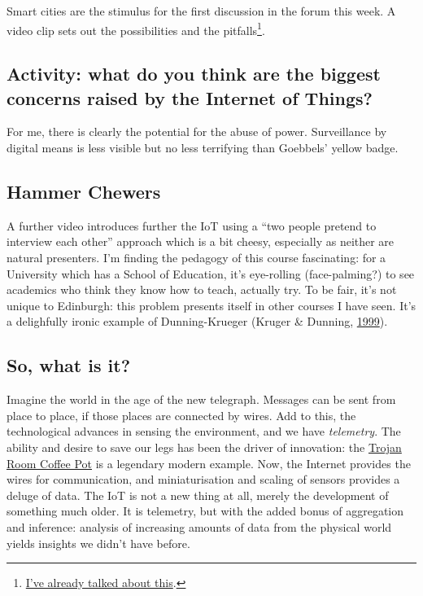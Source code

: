 \documentclass[
]{book}
\begin{document}
Smart cities are the stimulus for the first discussion in the forum this week. A video clip sets out the possibilities and the pitfalls\footnote{\protect\hyperlink{china-scs}{I've already talked about this}.}.

\hypertarget{activity-what-do-you-think-are-the-biggest-concerns-raised-by-the-internet-of-things}{%
\subsection{Activity: what do you think are the biggest concerns raised by the Internet of Things?}\label{activity-what-do-you-think-are-the-biggest-concerns-raised-by-the-internet-of-things}}

For me, there is clearly the potential for the abuse of power. Surveillance by digital means is less visible but no less terrifying than Goebbels' yellow badge.

\hypertarget{hammer-chewers}{%
\subsection{Hammer Chewers}\label{hammer-chewers}}

A further video introduces further the IoT using a ``two people pretend to interview each other'' approach which is a bit cheesy, especially as neither are natural presenters. I'm finding the pedagogy of this course fascinating: for a University which has a School of Education, it's eye-rolling (face-palming?) to see academics who think they know how to teach, actually try. To be fair, it's not unique to Edinburgh: this problem presents itself in other courses I have seen. It's a delighfully ironic example of Dunning-Krueger (Kruger \& Dunning, \protect\hyperlink{ref-Kruger1999}{1999}).

\hypertarget{so-what-is-it}{%
\subsection{So, what is it?}\label{so-what-is-it}}

Imagine the world in the age of the new telegraph. Messages can be sent from place to place, if those places are connected by wires. Add to this, the technological advances in sensing the environment, and we have \emph{telemetry}. The ability and desire to save our legs has been the driver of innovation: the \href{https://en.wikipedia.org/wiki/Trojan_Room_coffee_pot}{Trojan Room Coffee Pot} is a legendary modern example. Now, the Internet provides the wires for communication, and miniaturisation and scaling of sensors provides a deluge of data. The IoT is not a new thing at all, merely the development of something much older. It is telemetry, but with the added bonus of aggregation and inference: analysis of increasing amounts of data from the physical world yields insights we didn't have before.
\end{document}
